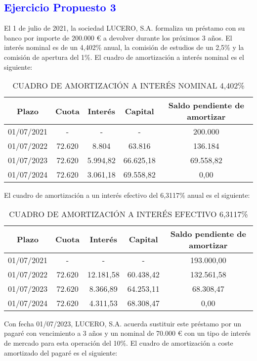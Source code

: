 \subsection*{\textcolor{blue}{Ejercicio Propuesto 3}}

El 1 de julio de 2021, la sociedad LUCERO, S.A. formaliza un préstamo con su banco por importe de 200.000 € a devolver durante los próximos 3 años. El interés nominal es de un 4,402\% anual, la comisión de estudios de un 2,5\% y la comisión de apertura del 1\%. El cuadro de amortización a interés nominal es el siguiente:

\begin{table}[H]
\centering
\begin{tabular}{|c|c|c|c|c|}
\hline
\textbf{Plazo} & \textbf{Cuota} & \textbf{Interés} & \textbf{Capital} & \textbf{Saldo pendiente de amortizar} \\ \hline
01/07/2021 & - & - & - & 200.000 \\ \hline
01/07/2022 & 72.620 & 8.804 & 63.816 & 136.184 \\ \hline
01/07/2023 & 72.620 & 5.994,82 & 66.625,18 & 69.558,82 \\ \hline
01/07/2024 & 72.620 & 3.061,18 & 69.558,82 & 0,00 \\ \hline
\end{tabular}
\caption{CUADRO DE AMORTIZACIÓN A INTERÉS NOMINAL 4,402\%}
\end{table}

El cuadro de amortización a un interés efectivo del 6,3117\% anual es el siguiente:

\begin{table}[H]
\centering
\begin{tabular}{|c|c|c|c|c|}
\hline
\textbf{Plazo} & \textbf{Cuota} & \textbf{Interés} & \textbf{Capital} & \textbf{Saldo pendiente de amortizar} \\ \hline
01/07/2021 & - & - & - & 193.000,00 \\ \hline
01/07/2022 & 72.620 & 12.181,58 & 60.438,42 & 132.561,58 \\ \hline
01/07/2023 & 72.620 & 8.366,89 & 64.253,11 & 68.308,47 \\ \hline
01/07/2024 & 72.620 & 4.311,53 & 68.308,47 & 0,00 \\ \hline
\end{tabular}
\caption{CUADRO DE AMORTIZACIÓN A INTERÉS EFECTIVO 6,3117\%}
\end{table}

Con fecha 01/07/2023, LUCERO, S.A. acuerda sustituir este préstamo por un pagaré con vencimiento a 3 años y un nominal de 70.000 € con un tipo de interés de mercado para esta operación del 10\%. El cuadro de amortización a coste amortizado del pagaré es el siguiente:


